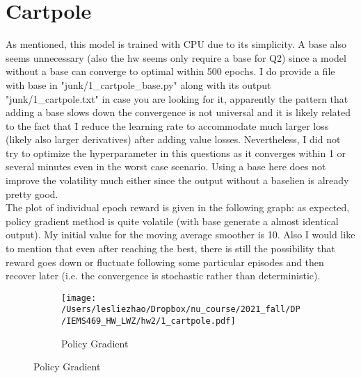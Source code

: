 \documentclass[12pt,letterpaper]{article}
\begin{document}
\section{Cartpole}
As mentioned, this model is trained with CPU due to its simplicity. A base also seems unnecessary (also the hw seems only require a base for Q2) since a model without a base can converge to optimal within 500 epochs. I do provide a file with base in "junk/1\_cartpole\_base.py" along with its output "junk/1\_cartpole.txt" in case you are looking for it, apparently the pattern that adding a base slows down the convergence is not universal and it is likely related to the fact that I reduce the learning rate to accommodate much larger loss (likely also larger derivatives) after adding value losses. Nevertheless, I did not try to optimize the hyperparameter in this questions as it converges within 1 or several minutes even in the worst case scenario. Using a base here does not improve the volatility much either since the output without a baselien is already pretty good.\\

The plot of individual epoch reward is given in the following graph: as expected, policy gradient method is quite volatile (with base generate a almost identical output). My initial value for the moving average smoother is 10. Also I would like to mention that even after reaching the best, there is still the possibility that reward goes down or fluctuate following some particular episodes and then recover later (i.e. the convergence is stochastic rather than deterministic). 
 \begin{figure}[H]
 	\centering
 	\caption{Cartpole game}
 	\begin{subfigure}[h]{0.9\textwidth}
 		\centering
 		\texttt{[image: /Users/lesliezhao/Dropbox/nu\_course/2021\_fall/DP/IEMS469\_HW\_LWZ/hw2/1\_cartpole.pdf]}
 		\caption{Policy Gradient}
 	\end{subfigure}
 \end{figure}
\end{document}
